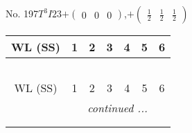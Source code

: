 \documentclass[fleqn,9pt,landscape]{jsarticle}
\begin{document}
\newpage
No. 197\quad$T_{}^{3}$\quad$I23$\quad[ cubic ]\quad$+\begin{pmatrix} 0 & 0 & 0 \end{pmatrix}$,\quad $+\begin{pmatrix} \frac{1}{2} & \frac{1}{2} & \frac{1}{2} \end{pmatrix}$
\begin{center}
\renewcommand{\arraystretch}{1.2}
\begin{longtable}{ccccccc}
 \hline \hline
WL (SS) & 1 & 2 & 3 & 4 & 5 & 6 \\ \hline \endfirsthead

\multicolumn{6}{l}{\tablename\ \thetable{}} \\
 \hline \hline
WL (SS) & 1 & 2 & 3 & 4 & 5 & 6 \\ \hline \endhead

 \hline \hline
\multicolumn{6}{r}{\footnotesize\it continued ...} \\ \endfoot

 \hline \hline
\multicolumn{6}{r}{} \\ \endlastfoot


\end{longtable}
\end{center}
\end{document}

